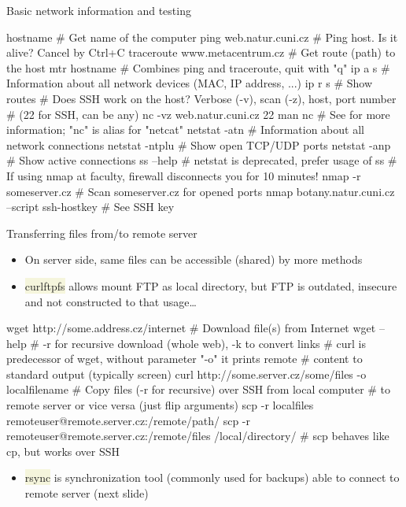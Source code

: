 \documentclass[compress, ucs, xelatex, 11pt, xcolor=svgnames, aspectratio=169,
	hyperref={
		bookmarks=true,
		unicode=true,
		colorlinks=true,
		pdftitle={Linux, command line and MetaCentrum},
		plainpages=false,
		pdfauthor={Vojtech Zeisek},
		pdfsubject={Course about use of Linux command line, writing shell scripts and using MetaCentrum of CESNET},
		pdfcreator={XeLaTeX},
		pdfkeywords={Linux, GNU, BASH, shell, command line, MetaCentrum},
		linkcolor=DarkRed, %
		anchorcolor=DarkBlue, %
		citecolor=Indigo, %
		filecolor=NavyBlue, %
		menucolor=DarkMagenta, %
		urlcolor=DarkBlue, %
		pdftex},
	url={hyphens, lowtilde} %
	]{beamer}
\renewcommand{\texttt}[1]{\colorbox{Beige}{{\ttfamily #1}}}
\begin{document}
\begin{frame}[fragile]{Basic network information and testing} %
	\begin{bashcode}
    hostname # Get name of the computer
    ping web.natur.cuni.cz # Ping host. Is it alive? Cancel by Ctrl+C
    traceroute www.metacentrum.cz # Get route (path) to the host
    mtr hostname # Combines ping and traceroute, quit with "q"
    ip a s # Information about all network devices (MAC, IP address, ...)
    ip r s # Show routes
    # Does SSH work on the host? Verbose (-v), scan (-z), host, port number
    # (22 for SSH, can be any)
    nc -vz web.natur.cuni.cz 22
    man nc # See for more information; "nc" is alias for "netcat"
    netstat -atn # Information about all network connections
    netstat -ntplu # Show open TCP/UDP ports
    netstat -anp # Show active connections
    ss --help # netstat is deprecated, prefer usage of ss
    # If using nmap at faculty, firewall disconnects you for 10 minutes!
    nmap -r someserver.cz # Scan someserver.cz for opened ports
    nmap botany.natur.cuni.cz --script ssh-hostkey # See SSH key
	\end{bashcode}
\end{frame}

\begin{frame}[fragile]{Transferring files from/to remote server}
	\label{transfers}
	\begin{itemize}
		\item On server side, same files can be accessible (shared) by more methods
		\item \texttt{curlftpfs} allows mount FTP as local directory, but FTP is outdated, insecure and not constructed to that usage\ldots
	\end{itemize}
	\vfill
	\begin{bashcode}
    wget http://some.address.cz/internet # Download file(s) from Internet
    wget --help # -r for recursive download (whole web), -k to convert links
    # curl is predecessor of wget, without parameter "-o" it prints remote
    # content to standard output (typically screen)
    curl http://some.server.cz/some/files -o localfilename
    # Copy files (-r for recursive) over SSH from local computer
    # to remote server or vice versa (just flip arguments)
    scp -r localfiles remoteuser@remote.server.cz:/remote/path/
    scp -r remoteuser@remote.server.cz:/remote/files /local/directory/
    # scp behaves like cp, but works over SSH
	\end{bashcode}
	\vfill
	\begin{itemize}
		\item \texttt{rsync} is synchronization tool (commonly used for backups) able to connect to remote server (next slide)
	\end{itemize}
\end{frame}
\end{document}
